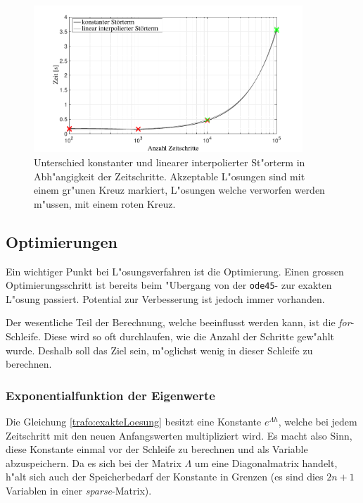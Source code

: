 \begin{refsection}
	
	\begin{figure}
			\centering
			\includegraphics[width=0.9\textwidth]{./trafo/images/differenceTimestep.pdf}
			\caption{Unterschied konstanter und linearer interpolierter St"orterm in Abh"angigkeit der Zeitschritte. Akzeptable L"osungen sind mit einem gr"unen Kreuz markiert, L"osungen welche verworfen werden m"ussen, mit einem roten Kreuz.}
			\label{trafo:differenceTimestep}
	\end{figure}
		
\subsection{Optimierungen \label{trafo:SecOptimierung}}

Ein wichtiger Punkt bei L"osungsverfahren ist die Optimierung. Einen grossen Optimierungsschritt ist bereits beim "Ubergang von der \texttt{ode45}- zur exakten L"osung passiert. Potential zur Verbesserung ist jedoch immer vorhanden.

Der wesentliche Teil der Berechnung, welche beeinflusst werden kann, ist die \textit{for}-Schleife. Diese wird so oft durchlaufen, wie die Anzahl der Schritte gew"ahlt wurde. Deshalb soll das Ziel sein, m"oglichst wenig in dieser Schleife zu berechnen. 

\subsubsection{Exponentialfunktion der Eigenwerte}
Die Gleichung \ref{trafo:exakteLoesung} besitzt eine Konstante $e^{\Lambda h}$, welche bei jedem Zeitschritt mit den neuen Anfangswerten multipliziert wird. Es macht also Sinn, diese Konstante einmal vor der Schleife zu berechnen und als Variable abzuspeichern. Da es sich bei der Matrix $\Lambda$ um eine Diagonalmatrix handelt, h"alt sich auch der Speicherbedarf der Konstante in Grenzen (es sind dies $2n + 1$ Variablen in einer \textit{sparse}-Matrix). 


\end{refsection}

